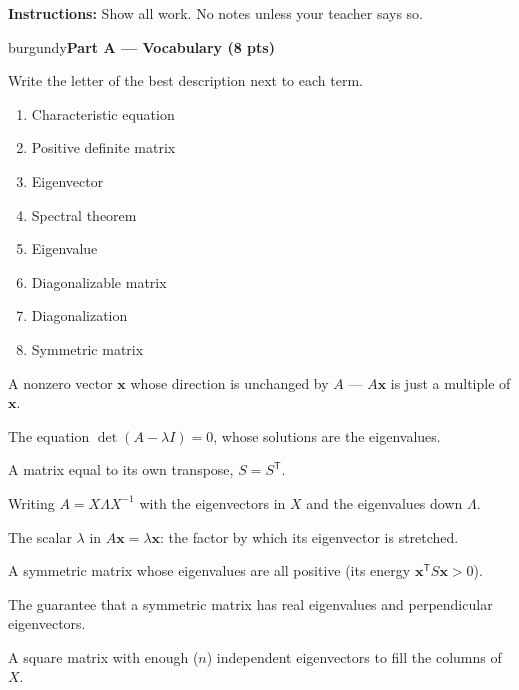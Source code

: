 \documentclass[10pt]{article}
\newcommand{\xx}{\mathbf{x}}
\newcommand{\T}{^{\mathsf T}}
\newcommand{\parthead}[1]{%
  \vspace{6pt}\noindent
  \begin{headlinebox}{burgundy}{\color{white}\bfseries #1}\end{headlinebox}%
  \vspace{4pt}}
\begin{document}
\namedateperiod

\vspace{0.06in}
\noindent\textbf{Instructions:} Show all work. No notes unless your teacher says so.

\parthead{Part A --- Vocabulary (8 pts)}
Write the letter of the best description next to each term.

\vspace{4pt}
\noindent
\begin{minipage}[t]{0.40\textwidth}
\begin{enumerate}[leftmargin=2.2em, itemsep=7pt, label=\arabic*.]
  \item Characteristic equation 
  \item Positive definite matrix 
  \item Eigenvector 
  \item Spectral theorem 
  \item Eigenvalue 
  \item Diagonalizable matrix 
  \item Diagonalization 
  \item Symmetric matrix 
\end{enumerate}
\end{minipage}%
\hfill
\begin{minipage}[t]{0.57\textwidth}
\small
\begin{description}[leftmargin=1.4em, itemsep=3pt]
  \item[(A)] A nonzero vector $\xx$ whose direction is unchanged by $A$ --- $A\xx$ is just a multiple of $\xx$.
  \item[(B)] The equation $\det(A-\lambda I)=0$, whose solutions are the eigenvalues.
  \item[(C)] A matrix equal to its own transpose, $S=S\T$.
  \item[(D)] Writing $A=X\Lambda X^{-1}$ with the eigenvectors in $X$ and the eigenvalues down $\Lambda$.
  \item[(E)] The scalar $\lambda$ in $A\xx=\lambda\xx$: the factor by which its eigenvector is stretched.
  \item[(F)] A symmetric matrix whose eigenvalues are all positive (its energy $\xx\T S\xx>0$).
  \item[(G)] The guarantee that a symmetric matrix has real eigenvalues and perpendicular eigenvectors.
  \item[(H)] A square matrix with enough ($n$) independent eigenvectors to fill the columns of $X$.
\end{description}
\end{minipage}
\end{document}
